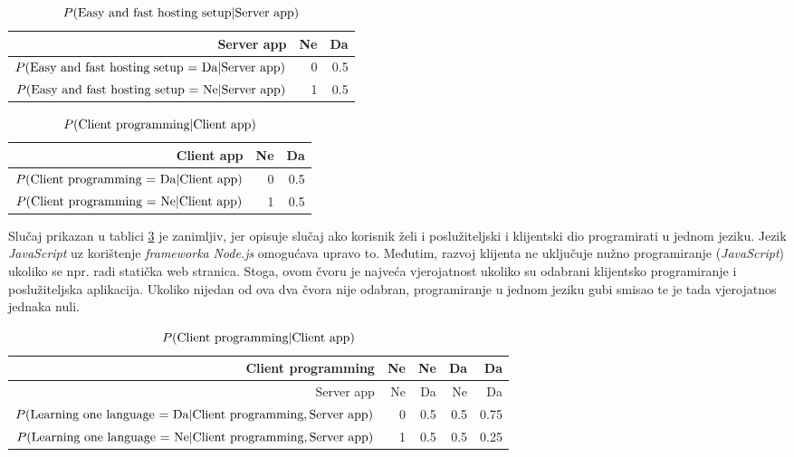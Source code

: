 \documentclass{article}
\begin{document}
	\begin{table}[h]
		\centering
		\begin{tabular}{ r || r | r }
			Server app	& Ne & Da \\ \hline
			$ P(\textnormal{Easy and fast hosting setup = Da} | \textnormal{Server app}) $ & 0 & 0.5 \\
			$ P(\textnormal{Easy and fast hosting setup = Ne} | \textnormal{Server app}) $ & 1 & 0.5 \\
			
		\end{tabular}
		\caption{$ P(\textnormal{Easy and fast hosting setup} | \textnormal{Server app}) $}
		\label{fig:easy_and_fast_p}
	\end{table}
	
	\begin{table}[h]
		\centering
		\begin{tabular}{ r || r | r }
			Client app	& Ne & Da \\ \hline
			$ P(\textnormal{Client programming = Da} | \textnormal{Client app}) $ & 0 & 0.5 \\
			$ P(\textnormal{Client programming = Ne} | \textnormal{Client app}) $ & 1 & 0.5 \\
			
		\end{tabular}
		\caption{$ P(\textnormal{Client programming} | \textnormal{Client app}) $}
		\label{fig:client_prog_p}
	\end{table}
	
	Slučaj prikazan u tablici \ref{fig:learning_one_p} je zanimljiv, jer opisuje slučaj ako korisnik želi i poslužiteljski i klijentski dio programirati u jednom jeziku. Jezik \textit{JavaScript} uz korištenje \textit{frameworka} \textit{Node.js} omogućava upravo to. Međutim, razvoj klijenta ne uključuje nužno programiranje (\textit{JavaScript}) ukoliko se npr. radi statička web stranica. Stoga, ovom čvoru je najveća vjerojatnost ukoliko su odabrani klijentsko programiranje i poslužiteljska aplikacija. Ukoliko nijedan od ova dva čvora nije odabran, programiranje u jednom jeziku gubi smisao te je tada vjerojatnos jednaka nuli.
	
	\begin{table}[h]
		\centering
		\begin{tabular}{ r || r | r | r | r }
			Client programming & Ne & Ne & Da & Da  \\ \hline
			Server app & Ne & Da & Ne & Da  \\ \hline
			$ P(\textnormal{Learning one language = Da} | \textnormal{Client programming},\textnormal{Server app} ) $ & 0 & 0.5 & 0.5 & 0.75 \\
			$ P(\textnormal{Learning one language = Ne} | \textnormal{Client programming},\textnormal{Server app} ) $ & 1 & 0.5 & 0.5 & 0.25 \\
			
		\end{tabular}
		\caption{$ P(\textnormal{Client programming} | \textnormal{Client app}) $}
		\label{fig:learning_one_p}
	\end{table}
	
\end{document}
